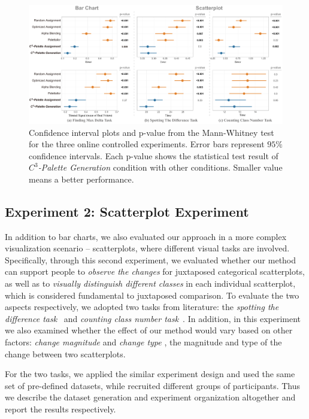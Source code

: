 {\begin{figure}[t]
\centering
\includegraphics[width=1\linewidth]{figures/user-result-formal.pdf}
\caption{Confidence interval plots and p-value from the Mann-Whitney test for the three online controlled experiments. Error bars represent $95\%$ confidence intervals. Each p-value shows the statistical test result of \emph{$C^3$-Palette Generation} condition with other conditions. Smaller value means a better performance.}
\vspace*{-3mm}
\label{fig:userResults}
\end{figure}

\subsection{Experiment 2: Scatterplot Experiment}
\label{subsec:scatterplotExp}
In addition to bar charts, we also evaluated our approach in a more complex visualization scenario -- scatterplots, where different visual tasks are involved.
Specifically, through this second experiment, we evaluated whether our method can support people to \emph{observe the changes} for juxtaposed categorical scatterplots, as well as to \emph{visually distinguish different classes} in each individual scatterplot, which is considered fundamental to juxtaposed comparison.
To evaluate the two aspects respectively, we adopted two tasks from literature: the \emph{spotting the difference task}~\cite{Fukuba2009} and \emph{counting class number task}~\cite{Lu21}.
In addition, in this experiment we also examined whether the effect of our method would vary based on other factors: \emph{change magnitude} and \emph{change type} , the magnitude and type of the change between two scatterplots.

For the two tasks, we applied the similar experiment design and used the same set of pre-defined datasets, while recruited different groups of participants. Thus we describe the dataset generation and experiment organization altogether and report the results respectively.


}
